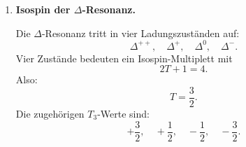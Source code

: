 \documentclass[11pt,a4paper]{scrartcl}
\newcommand{\ket}[1]{\left| #1 \right\rangle}
\theoremstyle{definition}
\theoremstyle{plain}
\theoremstyle{remark}
\begin{document}
\begin{enumerate}[label=(\alph*)]
    \begin{calculationbox}[title=Gesuchte Umkehrung]
        Gesucht sind die Produktzustände in der Gesamtisospinbasis.

        Direkt gilt:
        \[
            \ket{\pi^+p}
            =
            \ket{\frac32,\frac32}.
        \]

        Für $\ket{\pi^-p}$ und $\ket{\pi^0n}$ invertieren wir die beiden Gleichungen für $T_3=-\frac12$:
        \[
            \ket{\frac32,-\frac12}
            =
            \sqrt{\frac13}\ket{\pi^-p}
            +
            \sqrt{\frac23}\ket{\pi^0n},
        \]
        \[
            \ket{\frac12,-\frac12}
            =
            \sqrt{\frac23}\ket{\pi^-p}
            -
            \sqrt{\frac13}\ket{\pi^0n}.
        \]
        Daraus folgt:
        \[
            \ket{\pi^-p}
            =
            \sqrt{\frac13}\ket{\frac32,-\frac12}
            +
            \sqrt{\frac23}\ket{\frac12,-\frac12},
        \]
        \[
            \ket{\pi^0n}
            =
            \sqrt{\frac23}\ket{\frac32,-\frac12}
            -
            \sqrt{\frac13}\ket{\frac12,-\frac12}.
        \]
    \end{calculationbox}

    \begin{answerbox}
        Die gesuchten Zerlegungen sind
        \[
            \boxed{
            \ket{\pi^+p}
            =
            \ket{\frac32,\frac32}}
        \]
        \[
            \boxed{
            \ket{\pi^-p}
            =
            \sqrt{\frac13}\ket{\frac32,-\frac12}
            +
            \sqrt{\frac23}\ket{\frac12,-\frac12}}
        \]
        \[
            \boxed{
            \ket{\pi^0n}
            =
            \sqrt{\frac23}\ket{\frac32,-\frac12}
            -
            \sqrt{\frac13}\ket{\frac12,-\frac12}}
        \]
        bis auf eine globale Phasenkonvention der Clebsch-Gordan-Koeffizienten.
    \end{answerbox}

    \item \textbf{Isospin der $\Delta$-Resonanz.}

    \begin{calculationbox}
        Die $\Delta$-Resonanz tritt in vier Ladungszuständen auf:
        \[
            \Delta^{++},\quad \Delta^+,\quad \Delta^0,\quad \Delta^-.
        \]
        Vier Zustände bedeuten ein Isospin-Multiplett mit
        \[
            2T+1=4.
        \]
        Also:
        \[
            T=\frac32.
        \]
        Die zugehörigen $T_3$-Werte sind:
        \[
            +\frac32,\quad +\frac12,\quad -\frac12,\quad -\frac32.
        \]
    \end{calculationbox}


\end{enumerate}
\end{document}
